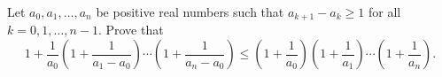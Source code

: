 Let $a_0,a_1,\dots,a_n$ be positive real numbers such that $a_{k+1}-a_k \geq 1$ for all $k=0,1,\dots,n-1.$ Prove that
\[1+\frac{1}{a_0} \left( 1+\frac1{a_1-a_0}\right)\cdots\left(1+\frac1{a_n-a_0}\right)\leq \left(1+\frac1{a_0}\right) \left(1+\frac1{a_1}\right)\cdots \left(1+\frac1{a_n}\right).\]